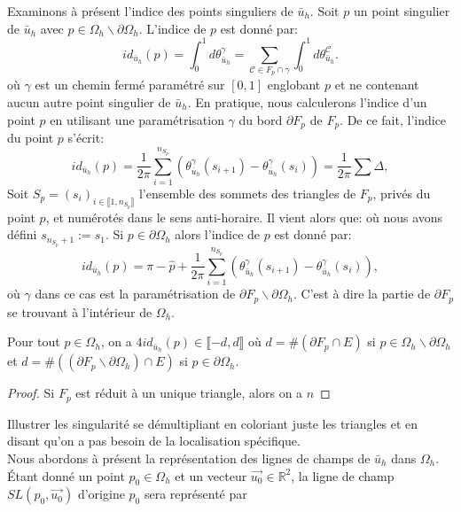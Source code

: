 Examinons à présent l'indice des points singuliers de $\bar{u}_h$. Soit $p$ un point singulier de $\bar{u}_h$ avec $p\in\Omega_h\backslash\partial\Omega_h$. L'indice de $p$ est donné par:
$$
id_{\bar{u}_h}(p)=\int_0^1 d\theta^\gamma_{\bar{u}_h}=\sum_{\mathcal{C}\in F_p\cap\gamma}\int_0^1 d\theta^{\mathcal{C}}_{\bar{u}_h}.
$$
où $\gamma$ est un chemin fermé paramétré sur $[0, 1]$ englobant $p$ et ne contenant aucun autre point singulier de $\bar{u}_h$. En pratique, nous calculerons l'indice d'un point $p$ en utilisant une paramétrisation $\gamma$ du bord $\partial F_p$ de $F_p$. De ce fait, l'indice du point $p$ s'écrit:
\begin{equation}
    id_{\bar{u}_h}(p)=\displaystyle\frac{1}{2\pi}\displaystyle\sum_{i=1}^{n_{S_p}}\left(\theta^\gamma_{\bar{u}_h}(s_{i+1})-\theta^\gamma_{\bar{u}_h}(s_i)\right)=\displaystyle\frac{1}{2\pi}\sum\Delta,
\end{equation}
 Soit $S_p=(s_i)_{i\in\llbracket 1, n_{S_p}\rrbracket}$ l'ensemble des sommets des triangles de $F_p$, privés du point $p$, et numérotés dans le sens anti-horaire.  Il vient alors que:
où  nous avons défini $s_{n_{S_p}+1}:=s_1$.
Si $p\in\partial\Omega_h$ alors l'indice de $p$ est donné par:
\begin{equation}
    id_{\bar{u}_h}(p)=\pi-\widehat{p}+\displaystyle\frac{1}{2\pi}\displaystyle\sum_{i=1}^{n_{S_p}}\left(\theta^\gamma_{\bar{u}_h}(s_{i+1})-\theta^\gamma_{\bar{u}_h}(s_i)\right),
\end{equation}
où $\gamma$ dans ce cas est la paramétrisation de $\partial F_p\backslash\partial\Omega_h$. C'est à dire la partie de $\partial F_p$ se trouvant à l'intérieur de $\Omega_h$.

\begin{proposition}
    Pour tout $p\in\Omega_h$, on a $4id_{\bar{u}_h}(p)\in\llbracket -d, d\rrbracket$ où $d=\#(\partial F_p\cap E)$ si $p\in\Omega_h\backslash\partial\Omega_h$ et $d=\#((\partial F_p\backslash\partial\Omega_h)\cap E)$ si $p\in\partial\Omega_h$.
\end{proposition}

\begin{proof}
    Si $F_p$ est réduit à un unique triangle, alors on a $n$
\end{proof}


Illustrer les singularité se démultipliant  en coloriant juste les triangles et en disant qu'on a pas besoin de la localisation spécifique.\\

Nous abordons à présent la représentation des lignes de champs de $\bar{u}_h$ dans $\Omega_h$. \'Etant donné un point $p_0\in\Omega_h$ et un vecteur $\overrightarrow{u_0}\in\mathbb{R}^2$, la ligne de champ $SL(p_0, \overrightarrow{u_0})$ d'origine $p_0$ sera représenté par 
